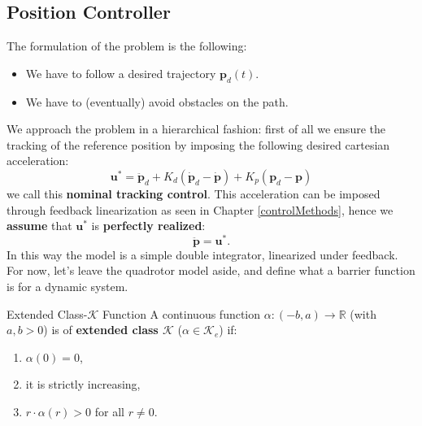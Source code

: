 \documentclass[10pt, a4paper]{report}
\begin{document}
\subsection{Position Controller}
The formulation of the problem is the following:\begin{itemize}
    \item We have to follow a desired trajectory $\mathbf p_d(t)$.
    \item We have to (eventually) avoid obstacles on the path.
\end{itemize}
We approach the problem in a hierarchical fashion: first of all we ensure the tracking of the reference position by imposing the following desired cartesian acceleration:\begin{equation}\label{nominal_controller}
    \mathbf u^*=\ddot{\mathbf p}_d+K_d(\dot{\mathbf p}_d-\dot{\mathbf p})+K_p(\mathbf p_d-\mathbf p)
\end{equation}
we call this \textbf{nominal tracking control}.
This acceleration can be imposed through feedback linearization as seen in Chapter \ref{controlMethods}, hence we \textbf{assume} that $\mathbf u^*$ is \textbf{perfectly realized}:\begin{equation}
    \ddot{\mathbf p}=\mathbf u^*.
\end{equation}
In this way the model is a simple double integrator, linearized under feedback. For now, let's leave the quadrotor model aside, and define what a barrier function is for a dynamic system.
\begin{boxdefinition}{Extended Class-$\mathcal K$ Function}{}
    A continuous function $\alpha: (-b, a) \to \mathbb{R}$ (with $a, b > 0$) is of \textbf{extended class $\mathcal{K}$} ($\alpha \in \mathcal{K}_e$) if:
\begin{enumerate}
    \item $\alpha(0) = 0$,
    \item it is strictly increasing,
    \item $r \cdot \alpha(r) > 0$ for all $r \neq 0$.
\end{enumerate}

\end{boxdefinition}
\end{document}
